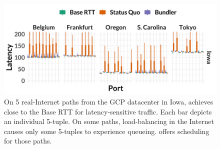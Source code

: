 \begin{figure}
    \centering
\begin{knitrout}
\color{fgcolor}
\includegraphics[width=\maxwidth]{figure/eval:realworld-1} 

\end{knitrout}
    \caption{On 5 real-Internet paths from the GCP datacenter in Iowa, \name achieves close to the Base RTT for latency-sensitive traffic. Each bar depicts an individual 5-tuple. On some paths, load-balancing in the Internet causes only some 5-tuples to experience queueing. \name offers scheduling for those paths.}
    \label{fig:eval:realworld}
\end{figure}
